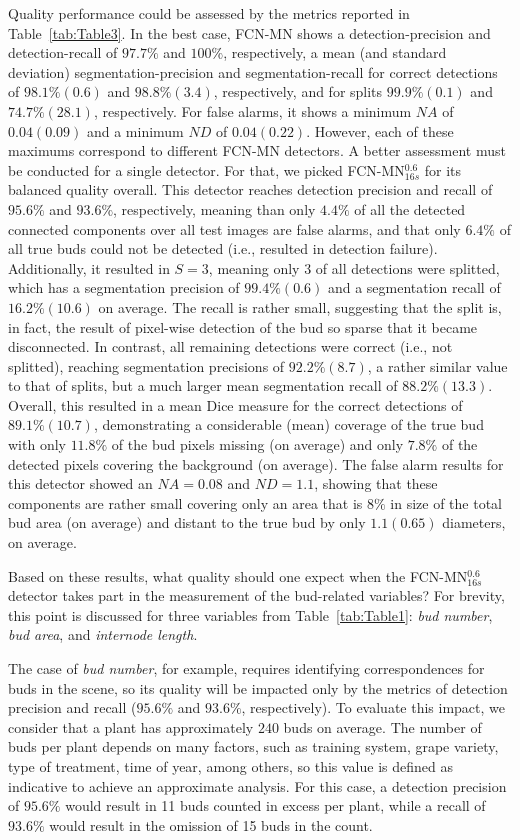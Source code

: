 \documentclass[a4paper,authoryear,review]{elsarticle}
\begin{document}
	Quality performance could be assessed by the metrics reported in Table~\ref{tab:Table3}. In the best case, FCN-MN shows a  detection-precision and detection-recall of $97.7\%$ and $100\%$, respectively, a mean (and standard deviation) segmentation-precision and segmentation-recall for correct detections of $98.1\%(0.6)$ and $98.8\%(3.4)$, respectively, and for splits $99.9\%(0.1)$ and $74.7\%(28.1)$, respectively. For false alarms, it shows a minimum  $NA$ of $0.04(0.09)$ and a minimum $ND$ of $0.04 (0.22)$.  
	However, each of these maximums correspond to different FCN-MN detectors. A better assessment must be conducted for a single detector. For that, we picked FCN-MN$_{16s}^{0.6}$ for its balanced quality overall. This detector reaches detection precision and recall of $95.6\%$ and $93.6\%$, respectively, meaning than only $4.4\%$ of all the detected connected components over all test images are false alarms, and that only $6.4\%$ of all true buds could not be detected (i.e., resulted in detection failure).
	Additionally, it resulted in $S=3$, meaning only $3$ of all detections were splitted, which has a segmentation precision of $99.4\%(0.6)$ and a segmentation recall of $16.2\%(10.6)$ on average. The recall is rather small, suggesting that the split is, in fact, the result of pixel-wise detection of the bud so sparse that it became disconnected. In contrast, all remaining detections were correct (i.e., not splitted), reaching segmentation precisions of $92.2\%(8.7)$, a rather similar value to that of splits, but a much larger mean segmentation recall of $88.2\%(13.3)$. Overall, this resulted in a mean Dice measure for the correct detections of $89.1\%(10.7)$, demonstrating a considerable (mean) coverage of the true bud with only $11.8\%$ of the bud pixels missing (on average) and only $7.8\%$ of the detected pixels covering the background (on average).
	The false alarm results for this detector showed an  $NA=0.08$ and $ND=1.1$, showing that these components are rather small covering only an area that is $8\%$ in size of the total bud area (on average) and distant to the true bud by only $1.1 (0.65)$ diameters, on average.
	
	Based on these results, what quality should one expect when the FCN-MN$_{16s}^{0.6}$ detector takes part in the measurement of the bud-related variables? For brevity, this point is discussed for three variables from Table~\ref{tab:Table1}: \emph{bud number}, \emph{bud area}, and \emph{internode length}.
	
	The case of \emph{bud number}, for example, requires identifying correspondences for buds in the scene, so its quality will be impacted only by the metrics of detection precision and recall ($95.6\%$ and $93.6\%$, respectively). To evaluate this impact, we consider that a plant has approximately $240$ buds on average. The number of buds per plant depends on many factors, such as training system, grape variety, type of treatment, time of year, among others, so this value is defined as indicative to achieve an approximate analysis. For this case, a detection precision of $95.6\%$ would result in 11 buds counted in excess per plant, while a recall of $93.6\%$ would result in the omission of 15 buds in the count. 
	
\end{document}
